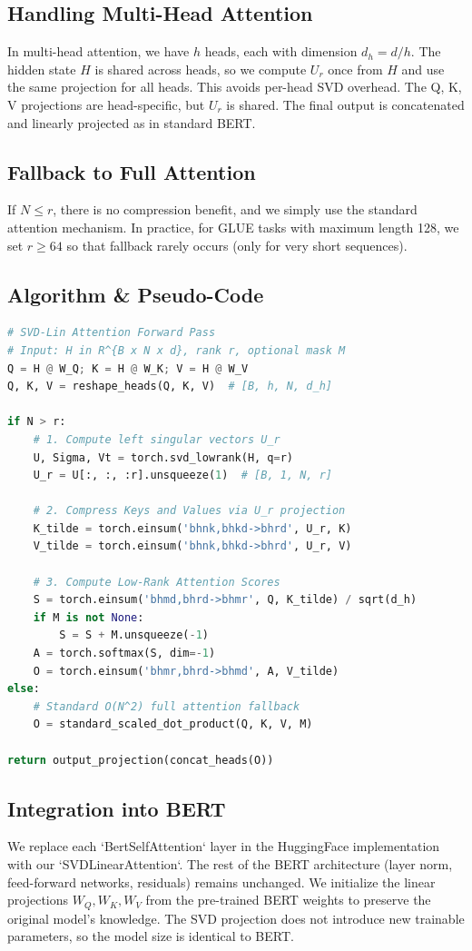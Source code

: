 \documentclass[twocolumn]{article}
\begin{document}
\subsection{Handling Multi-Head Attention}
In multi-head attention, we have $h$ heads, each with dimension $d_h = d / h$. The hidden state $H$ is shared across heads, so we compute $U_r$ once from $H$ and use the same projection for all heads. This avoids per-head SVD overhead. The Q, K, V projections are head-specific, but $U_r$ is shared. The final output is concatenated and linearly projected as in standard BERT.

\subsection{Fallback to Full Attention}
If $N \le r$, there is no compression benefit, and we simply use the standard attention mechanism. In practice, for GLUE tasks with maximum length 128, we set $r \ge 64$ so that fallback rarely occurs (only for very short sequences).

\subsection{Algorithm \& Pseudo-Code}
\begin{lstlisting}[language=Python, caption={SVD-Lin Attention Forward Pass}]
# SVD-Lin Attention Forward Pass
# Input: H in R^{B x N x d}, rank r, optional mask M
Q = H @ W_Q; K = H @ W_K; V = H @ W_V
Q, K, V = reshape_heads(Q, K, V)  # [B, h, N, d_h]

if N > r:
    # 1. Compute left singular vectors U_r
    U, Sigma, Vt = torch.svd_lowrank(H, q=r)
    U_r = U[:, :, :r].unsqueeze(1)  # [B, 1, N, r]

    # 2. Compress Keys and Values via U_r projection
    K_tilde = torch.einsum('bhnk,bhkd->bhrd', U_r, K)
    V_tilde = torch.einsum('bhnk,bhkd->bhrd', U_r, V)

    # 3. Compute Low-Rank Attention Scores
    S = torch.einsum('bhmd,bhrd->bhmr', Q, K_tilde) / sqrt(d_h)
    if M is not None:
        S = S + M.unsqueeze(-1)
    A = torch.softmax(S, dim=-1)
    O = torch.einsum('bhmr,bhrd->bhmd', A, V_tilde)
else:
    # Standard O(N^2) full attention fallback
    O = standard_scaled_dot_product(Q, K, V, M)

return output_projection(concat_heads(O))
\end{lstlisting}

\subsection{Integration into BERT}
We replace each `BertSelfAttention` layer in the HuggingFace implementation with our `SVDLinearAttention`. The rest of the BERT architecture (layer norm, feed-forward networks, residuals) remains unchanged. We initialize the linear projections $W_Q, W_K, W_V$ from the pre-trained BERT weights to preserve the original model's knowledge. The SVD projection does not introduce new trainable parameters, so the model size is identical to BERT.
\end{document}
